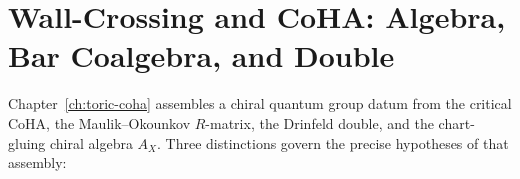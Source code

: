 \providecommand{\PhiFA}{\Phi^{\mathrm{FA}}}
\providecommand{\HolFA}{\mathrm{HolFA}}
\providecommand{\EdHolFA}{E_d\text{-}\HolFA}
\providecommand{\EnHolFA}{E_n\text{-}\HolFA}
\providecommand{\SpCh}{\mathrm{Sp}^{\mathrm{ch}}}
\providecommand{\intSigma}{\textstyle\int_{\Sigma_{d-1}}}
\providecommand{\hCS}{\mathrm{hCS}}

\chapter{Wall-Crossing and CoHA: Algebra, Bar Coalgebra, and Double}
\label{ch:coha-wall-crossing-platonic}

Chapter~\ref{ch:toric-coha} assembles a chiral quantum group datum from
the critical CoHA, the Maulik--Okounkov $R$-matrix, the Drinfeld double,
and the chart-gluing chiral algebra $A_X$. Three distinctions govern the
precise hypotheses of that assembly:

